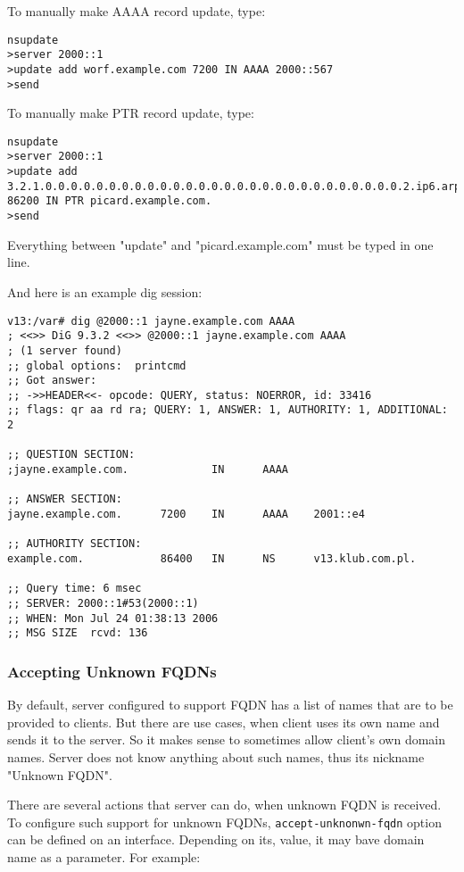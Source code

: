 \begin{enumerate}

To manually make AAAA record update, type:
\begin{lstlisting}
nsupdate
>server 2000::1
>update add worf.example.com 7200 IN AAAA 2000::567
>send
\end{lstlisting}

To manually make PTR record update, type:
\begin{lstlisting}
nsupdate
>server 2000::1
>update add
3.2.1.0.0.0.0.0.0.0.0.0.0.0.0.0.0.0.0.0.0.0.0.0.0.0.0.0.0.0.0.2.ip6.arpa.
86200 IN PTR picard.example.com.
>send
\end{lstlisting}

\Note Everything between "update" and "picard.example.com" must be typed in one line.

And here is an example dig session:

\begin{lstlisting}
v13:/var# dig @2000::1 jayne.example.com AAAA
; <<>> DiG 9.3.2 <<>> @2000::1 jayne.example.com AAAA
; (1 server found)
;; global options:  printcmd
;; Got answer:
;; ->>HEADER<<- opcode: QUERY, status: NOERROR, id: 33416
;; flags: qr aa rd ra; QUERY: 1, ANSWER: 1, AUTHORITY: 1, ADDITIONAL: 2

;; QUESTION SECTION:
;jayne.example.com.             IN      AAAA

;; ANSWER SECTION:
jayne.example.com.      7200    IN      AAAA    2001::e4

;; AUTHORITY SECTION:
example.com.            86400   IN      NS      v13.klub.com.pl.

;; Query time: 6 msec
;; SERVER: 2000::1#53(2000::1)
;; WHEN: Mon Jul 24 01:38:13 2006
;; MSG SIZE  rcvd: 136
\end{lstlisting}

\subsubsection{Accepting Unknown FQDNs}
By default, server configured to support FQDN has a list of names that
are to be provided to clients. But there are use cases, when client
uses its own name and sends it to the server. So it makes sense to
sometimes allow client's own domain names. Server does not know
anything about such names, thus its nickname "Unknown FQDN".

There are several actions that server can do, when unknown FQDN is
received. To configure such support for unknown FQDNs,
\verb+accept-unknonwn-fqdn+ option can be defined on an
interface. Depending on its, value, it may bave domain name as a parameter.
For example:


\end{enumerate}
